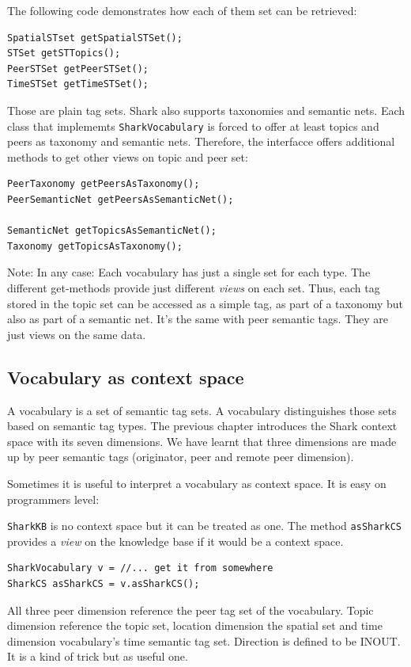 The following code demonstrates how each of them set can be retrieved:

\begin{verbatim}
SpatialSTset getSpatialSTSet();
STSet getSTTopics();
PeerSTSet getPeerSTSet();
TimeSTSet getTimeSTSet();
\end{verbatim} 

Those are plain tag sets. Shark also supports taxonomies and semantic nets. Each class that implememts {\tt SharkVocabulary} is forced to offer at least topics and peers as taxonomy and semantic nets. Therefore, the interfacce offers additional methods to get other views on topic and peer set:

\begin{verbatim}
PeerTaxonomy getPeersAsTaxonomy();
PeerSemanticNet getPeersAsSemanticNet();

SemanticNet getTopicsAsSemanticNet();
Taxonomy getTopicsAsTaxonomy();
\end{verbatim}

Note: In any case: Each vocabulary has just a single set for each type. The different get-methods provide just different {\it views} on each set. Thus, each tag stored in the topic set can be accessed as a simple tag, as part of a taxonomy but also as part of a semantic net. It's the same with peer semantic tags. They are just views on the same data.

\subsection{Vocabulary as context space}
A vocabulary is a set of semantic tag sets. A vocabulary distinguishes those sets based on semantic tag types. The previous chapter introduces the Shark context space with its seven dimensions. We have learnt that three dimensions are made up by peer semantic tags (originator, peer and remote peer dimension).

Sometimes it is useful to interpret a vocabulary as context space. It is easy on programmers level:

{\tt SharkKB} is no context space but it can be treated as one. The method {\tt asSharkCS} provides a {\it view} on the knowledge base if it would be a context space.

\begin{verbatim}
SharkVocabulary v = //... get it from somewhere
SharkCS asSharkCS = v.asSharkCS();
\end{verbatim}

All three peer dimension reference the peer tag set of the vocabulary. Topic dimension reference the topic set, location dimension the spatial set and time dimension vocabulary's time semantic tag set. Direction is defined to be INOUT.
It is a kind of trick but as useful one.

